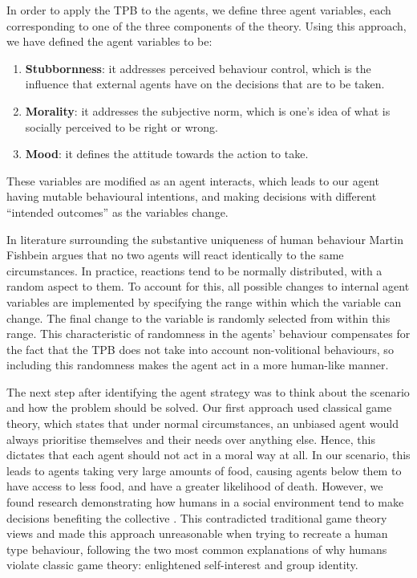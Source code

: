 In order to apply the TPB to the agents, we define three agent variables, each corresponding to one of the three components of the theory. Using this approach, we have defined the agent variables to be: 
\begin{enumerate}
    \item \textbf{Stubbornness}: it addresses perceived behaviour control, which is the influence that external agents have on the decisions that are to be taken.
    \item \textbf{Morality}: it addresses the subjective norm, which is one's idea of what is socially perceived to be right or wrong.
    \item \textbf{Mood}: it defines the attitude towards the action to take.
\end{enumerate}
These variables are modified as an agent interacts, which leads to our agent having mutable behavioural intentions, and making decisions with different “intended outcomes” as the variables change. \par
In literature surrounding the substantive uniqueness of human behaviour \cite{TRA} Martin Fishbein argues that no two agents will react identically to the same circumstances. In practice, reactions tend to be normally distributed, with a random aspect to them. To account for this, all possible changes to internal agent variables are implemented by specifying the range within which the variable can change. The final change to the variable is randomly selected from within this range. This characteristic of randomness in the agents’ behaviour compensates for the fact that the TPB does not take into account non-volitional behaviours, so including this randomness makes the agent act in a more human-like manner.\par 
The next step after identifying the agent strategy was to think about the scenario and how the problem should be solved. Our first approach used classical game theory, which states that under normal circumstances, an unbiased agent would always prioritise themselves and their needs over anything else. Hence, this dictates that each agent should not act in a moral way at all. In our scenario, this leads to agents taking very large amounts of food, causing agents below them to have access to less food, and have a greater likelihood of death. However, we found research demonstrating how humans in a social environment tend to make decisions benefiting the collective \cite{batson_batson_todd_brummett_shaw_aldeguer_1995}. This contradicted traditional game theory views and made this approach unreasonable when trying to recreate a human type behaviour, following the two most common explanations of why humans violate classic game theory: enlightened self-interest and group identity.\par 
